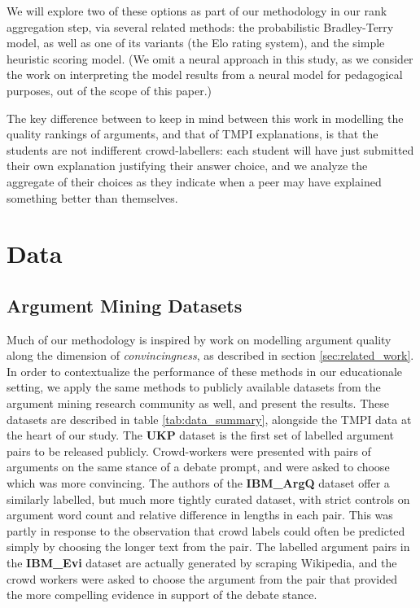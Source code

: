\documentclass[notitlepage,12pt]{jedm}
\begin{document}
We will explore two of these options as part of our methodology in our rank 
aggregation step, via several related methods: the probabilistic Bradley-Terry 
model, as well as one of its variants (the Elo rating system), and the simple 
heuristic scoring model.
(We omit a neural approach in this study, as we consider the work on 
interpreting the model results from a neural model for pedagogical purposes, 
out of the scope of this paper.)

The key difference between to keep in mind between this work in modelling the 
quality rankings of arguments, and that of TMPI explanations, is that the 
students are not indifferent crowd-labellers: each student will have just 
submitted their own explanation justifying their answer choice, and we analyze 
the aggregate of their choices as they indicate when a peer may have explained 
something better than themselves. 
\cite{piech_tuned_2013}
\cite{raman_methods_2014}
\cite{jones_peer_2015}


\section{Data}\label{sec:datasets}

\subsection{Argument Mining Datasets}
Much of our methodology is inspired by work on modelling argument quality along 
the dimension of \textit{convincingness}, as described in section 
\ref{sec:related_work}. 
In order to contextualize the performance of these methods in our educationale 
setting, we apply the same methods to publicly available datasets from the 
argument mining research community as well, and present the results. 
These datasets are described in table \ref{tab:data_summary}, alongside the 
TMPI data at the heart of our study. 
The \textbf{UKP} dataset\cite{habernal_which_2016} is the first set of labelled 
argument pairs to be released publicly.
Crowd-workers were presented with pairs of arguments on the same stance of a 
debate prompt, and were asked to choose which was more convincing.
The authors of the \textbf{IBM\_ArgQ} dataset\cite{toledo_automatic_2019} offer 
a similarly labelled, but much more tightly curated dataset, with strict 
controls on argument word count and relative difference in lengths in each pair.
This was partly in response to the observation that crowd labels could often be 
predicted simply by choosing the longer text from the pair.
The labelled argument pairs in the \textbf{IBM\_Evi} dataset 
\cite{gleize_are_2019} are actually generated by scraping Wikipedia, and the 
crowd workers were asked to choose the argument from the pair that provided the 
more compelling evidence in support of the debate stance.
\end{document}
